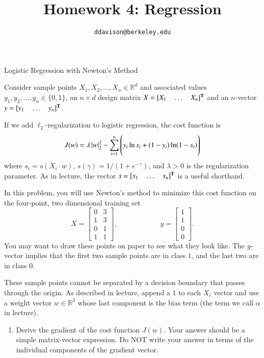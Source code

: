 \documentclass[section]{problemset}
\title{Homework 4: Regression}
\subtitle{\texttt{ddavison@berkeley.edu}}
\def\1{{\mathbf 1}}
\begin{document}
\newpage


\begin{problem}{Logistic Regression with Newton's Method}

Consider sample points $X_1, X_2, \ldots, X_n \in \mathbb{R}^d$ and
associated values $y_1, y_2, \ldots, y_n \in \{ 0, 1 \}$,
an $n \times d$ design matrix $X = [X_1~~~~\dots~~~~X_n]^{\mathbf{T}}$ and
an $n$-vector $y = [y_1~~~~\dots~~~~y_n]^{\mathbf{T}}$.

If we add $\ell_2$-regularization to logistic regression,
the cost function is
\[
J(w) = \lambda \, |w|^2_2 -
\sum_{i=1}^n \left(y_i \ln s_i + (1-y_i) \ln (1 - s_i) \rule{0pt}{18pt} \right)
\]
where $s_i = s(X_i \cdot w)$, $s(\gamma) = 1 / (1 + e^{- \gamma})$, and
$\lambda > 0$ is the regularization parameter.
As in lecture, the vector $s = [s_1~~~~\dots~~~~s_n]^{\mathbf{T}}$ is
a useful shorthand.

In this problem, you will use Newton's method to minimize this cost function
on the four-point, two dimensional training set
\[
X = \begin{bmatrix} 0 &3 \\ 1& 3\\ 0 &1\\ 1 &1 \end{bmatrix},
\hspace{1in}
y = \begin{bmatrix} 1\\1\\0\\0 \end{bmatrix}.
\]
You may want to draw these points on paper to see what they look like.
The $y$-vector implies that the first two sample points are in class $1$, and
the last two are in class $0$.

These sample points cannot be separated by a decision boundary that
passes through the origin.
As described in lecture, append a $1$ to each $X_i$ vector and
use a weight vector $w \in \mathbb{R}^3$ whose last component is
the bias term (the term we call $\alpha$ in lecture).

\begin{enumerate}
\item
Derive the gradient of the cost function $J(w)$.
Your answer should be a simple matrix-vector expression.
Do NOT write your answer in terms of the individual components of
the gradient vector.


\end{enumerate}
\end{problem}
\end{document}
